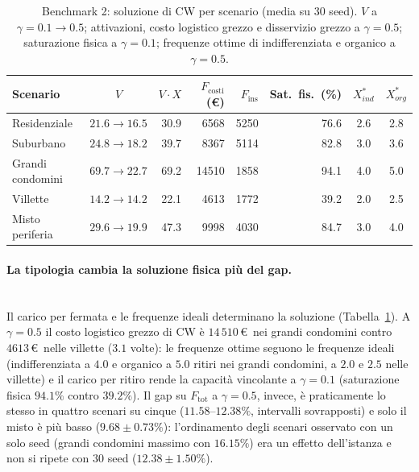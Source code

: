 \begin{table}[htbp]
	\centering
	\caption{Benchmark 2: soluzione di CW per scenario (media su 30 seed). $V$ a $\gamma=0.1\rightarrow0.5$; attivazioni, costo logistico grezzo e disservizio grezzo a $\gamma=0.5$; saturazione fisica a $\gamma=0.1$; frequenze ottime di indifferenziata e organico a $\gamma=0.5$.}
	\label{tab:b2_fisica}
	\small
	\begin{tabular}{lcrrrrcc}
		\hline
		Scenario & $V$ & $V\!\cdot\!X$ & $F_{\mathrm{costi}}$ (\euro) & $F_{\mathrm{ins}}$ & Sat.\ fis.\ (\%) & $X^*_{ind}$ & $X^*_{org}$ \\
		\hline
		Residenziale     & $21.6\rightarrow16.5$ & 30.9 & 6568  & 5250 & 76.6 & 2.6 & 2.8 \\
		Suburbano        & $24.8\rightarrow18.2$ & 39.7 & 8367  & 5114 & 82.8 & 3.0 & 3.6 \\
		Grandi condomini & $69.7\rightarrow22.7$ & 69.2 & 14510 & 1858 & 94.1 & 4.0 & 5.0 \\
		Villette         & $14.2\rightarrow14.2$ & 22.1 & 4613  & 1772 & 39.2 & 2.0 & 2.5 \\
		Misto periferia  & $29.6\rightarrow19.9$ & 47.3 & 9998  & 4030 & 84.7 & 3.0 & 4.0 \\
		\hline
	\end{tabular}
\end{table}

\paragraph{La tipologia cambia la soluzione fisica più del gap.}\mbox{}\\
Il carico per fermata e le frequenze ideali determinano la soluzione (Tabella~\ref{tab:b2_fisica}). A $\gamma=0.5$ il costo logistico grezzo di CW è $14\,510$\,\euro\ nei grandi condomini contro $4613$\,\euro\ nelle villette ($3.1$ volte): le frequenze ottime seguono le frequenze ideali (indifferenziata a $4.0$ e organico a $5.0$ ritiri nei grandi condomini, a $2.0$ e $2.5$ nelle villette) e il carico per ritiro rende la capacità vincolante a $\gamma=0.1$ (saturazione fisica $94.1\%$ contro $39.2\%$). Il gap su $F_{\mathrm{tot}}$ a $\gamma=0.5$, invece, è praticamente lo stesso in quattro scenari su cinque ($11.58$--$12.38\%$, intervalli sovrapposti) e solo il misto è più basso ($9.68\pm0.73\%$): l'ordinamento degli scenari osservato con un solo seed (grandi condomini massimo con $16.15\%$) era un effetto dell'istanza e non si ripete con 30 seed ($12.38\pm1.50\%$).

